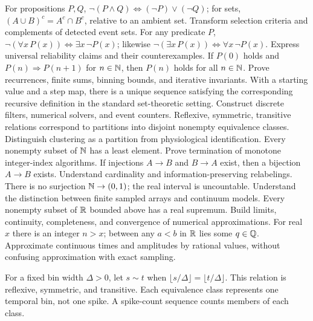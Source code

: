 {For propositions $P,Q$, $\neg(P\land Q)\Leftrightarrow
(\neg P)\lor(\neg Q)$; for sets,
$(A\cup B)^c=A^c\cap B^c$, relative to an ambient set.}
{Transform selection criteria and complements of detected event sets.}
{For any predicate $P$, $\neg(\forall x\,P(x))\Leftrightarrow
\exists x\,\neg P(x)$; likewise
$\neg(\exists x\,P(x))\Leftrightarrow\forall x\,\neg P(x)$.}
{Express universal reliability claims and their counterexamples.}
{If $P(0)$ holds and $P(n)\Rightarrow P(n+1)$ for $n\in\mathbb{N}$,
then $P(n)$ holds for all $n\in\mathbb{N}$.}
{Prove recurrences, finite sums, binning bounds, and iterative invariants.}
{With a starting value and a step map, there is a unique
sequence satisfying the corresponding recursive definition
in the standard set-theoretic setting.}
{Construct discrete filters, numerical solvers, and event counters.}
{Reflexive, symmetric, transitive relations correspond to partitions
into disjoint nonempty equivalence classes.}
{Distinguish clustering as a partition from physiological identification.}
{Every nonempty subset of $\mathbb{N}$ has a least element.}
{Prove termination of monotone integer-index algorithms.}
{If injections $A\to B$ and $B\to A$ exist, then a bijection
$A\to B$ exists.}
{Understand cardinality and information-preserving relabelings.}
{There is no surjection $\mathbb{N}\to(0,1)$; the real interval
is uncountable.}
{Understand the distinction between finite sampled arrays and continuum models.}
{Every nonempty subset of $\mathbb{R}$ bounded above has a real supremum.}
{Build limits, continuity, completeness, and convergence of numerical approximations.}
{For real $x$ there is an integer $n>x$; between any
$a<b$ in $\mathbb{R}$ lies some $q\in\mathbb{Q}$.}
{Approximate continuous times and amplitudes by rational values, without confusing
approximation with exact sampling.}

\begin{example}
For a fixed bin width $\Delta>0$, let $s\sim t$ when
$\lfloor s/\Delta\rfloor=\lfloor t/\Delta\rfloor$.
This relation is reflexive, symmetric, and transitive.
Each equivalence class represents one temporal bin, not one spike.
A spike-count sequence counts members of each class.
\end{example}

